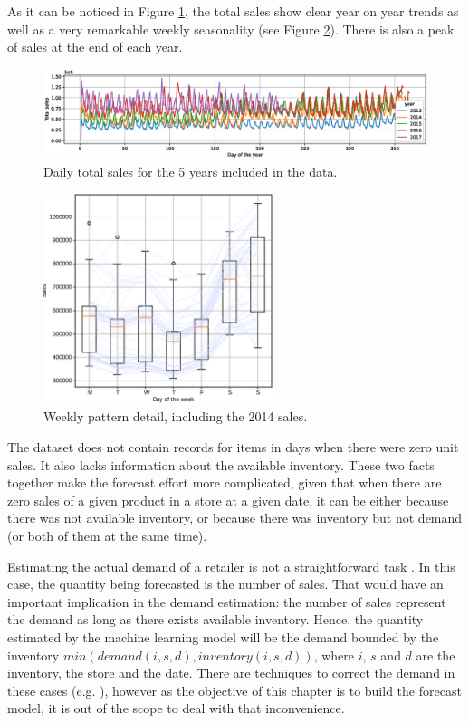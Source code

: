 As it can be noticed in Figure \ref{fig:timeseries}, the total sales show clear year on year trends as well as a very remarkable weekly seasonality (see Figure \ref{fig:timeseries_detail}). There is also a peak of sales at the end of each year.

 	\begin{figure}
 	\centering
 	\includegraphics[width=1\textwidth]{salesforecast/images/timeseries}
 	\caption[Daily total sales for the 5 years included in the data]{Daily total sales for the 5 years included in the data.}
 	\label{fig:timeseries}
\end{figure}

\begin{figure}
	\centering
	\includegraphics[width=0.6\textwidth]{salesforecast/images/timeseries_dow}
	\caption[Weekly sales pattern details]{Weekly pattern detail, including the 2014 sales.}
	\label{fig:timeseries_detail}
\end{figure}

The dataset does not contain records for items in days when there were zero unit sales. It also lacks information about the available inventory. These two facts together make the forecast effort more complicated, given that when there are zero sales of a given product in a store at a given date, it can be either because there was not available inventory, or because there was inventory but not demand (or both of them at the same time).

Estimating the actual demand of a retailer is not a straightforward task \autocite{Deep2019}. In this case, the quantity being forecasted is the number of sales. That would have an important implication in the demand estimation: the number of sales represent the demand as long as there exists available inventory. Hence, the quantity estimated by the machine learning model will be the demand bounded by the inventory $min(demand(i,s,d), inventory(i,s,d))$, where $i$, $s$ and $d$ are the inventory, the store and the date. There are techniques to correct the demand in these cases (e.g. \autocite{Bell2000}), however as the objective of this chapter is to build the forecast model, it is out of the scope to deal with that inconvenience.

